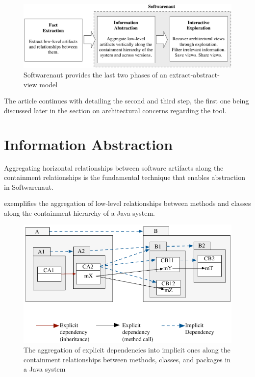 \documentclass[preprint,12pt]{elsarticle}
\begin{document}
\begin{figure}[h]
\begin{center}
\includegraphics[width=\linewidth]{SnautWorkflow}
\caption{Softwarenaut provides the last two phases of an extract-abstract-view model}
\end{center}
\end{figure}

The article continues with detailing the second and third step, the first one being discussed later in the section on architectural concerns regarding the tool.

\section {Information Abstraction} \label{sec:org}

Aggregating horizontal relationships between software artifacts along the containment relationships is the fundamental technique that enables abstraction in Softwarenaut. 

 exemplifies the aggregation of low-level relationships between methods and classes along the containment hierarchy of a Java system.

\begin{figure}[ht]
\begin{center}
\includegraphics[width=0.7\linewidth]{DependencyAggregation}
\caption{The aggregation of explicit dependencies into implicit ones along the containment relationships between methods, classes, and packages in a Java system}
\end{center}
\end{figure}
 
\end{document}
